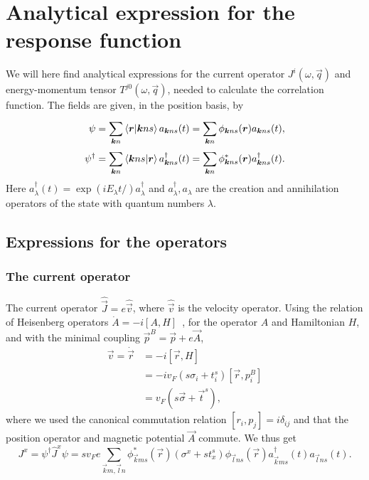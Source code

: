 \section{Analytical expression for the response function}
We will here find analytical expressions for the current operator $J^i(\omega, \vec{q})$ and energy-momentum tensor $T^{j 0}(\omega, \vec{q})$, needed to calculate the correlation function.
The fields are given, in the position basis, by
\begin{align}
  \psi &= \sum\limits_{\bm{k}n}^{}\braket{\bm{r} | \bm{k} n s} a_{\bm{k}ns}(t) = \sum\limits_{\bm{k}n}^{} \phi_{\bm{k} n s} (\bm{r}) a_{\bm{k}n s}(t),\\
  \psi^{\dagger} &= \sum\limits_{\bm{k}n}^{}
                   \braket{\bm{k} ns | \bm{r} }
                   a^{\dagger}_{\bm{k}ns}(t)
                   =\sum\limits_{\bm{k}n}^{} \phi^{*}_{\bm{k} n s} (\bm{r}) a^{\dagger}_{\bm{k}n s}(t).
\end{align}
Here $a_{\lambda }^{\dagger} (t) = \exp(iE_{\lambda } t / ) a_{\lambda }^{\dagger}$ and $a_{\lambda }^{\dagger}, a_{\lambda }$ are the creation and annihilation operators of the state with quantum numbers $\lambda $.
\subsection{Expressions for the operators}
\subsubsection{The current operator}
The current operator $\hat{\vec{J}} = e \hat{\vec{v}}$, where $\hat{\vec{v}}$ is the velocity operator.
Using the relation of Heisenberg operators $\dot{A} = -i [A, H] $~\cite{sakuraiModernQuantumMechanics2017}, for the operator $A$ and Hamiltonian $H$, and with the minimal coupling \( \vec{p}^B = \vec{p} + e \vec{A} \),
\begin{align}
  \vec{v} = \dot{\vec{r}} &= -i \left[ \vec{r}, H \right]\\
  &= -i v_F (s \sigma_i + t^s_i) \left[\vec{r}, p^B_i\right]\\
  &= v_F (s \vec{\sigma} + \vec{t}^s),
\end{align}
where we used the canonical commutation relation \( [r_i, p_j] = i \delta_{ij} \) and that the position operator and magnetic potential \( \vec{A} \) commute.
We thus get
\begin{equation}
  J^x = \psi ^{\dagger} \hat{J}^x \psi = sv_F e \sum\limits_{\vec{k}m, \vec{l}n}^{}
  \phi _{\vec{k}ms}^{*}(\vec{r}) \left(\sigma^x + s t^s_x\right) \phi _{\vec{l}ns}(\vec{r})
  a_{\vec{k}ms}^{\dagger}(t)
  a_{\vec{l}ns}(t).
\end{equation}

